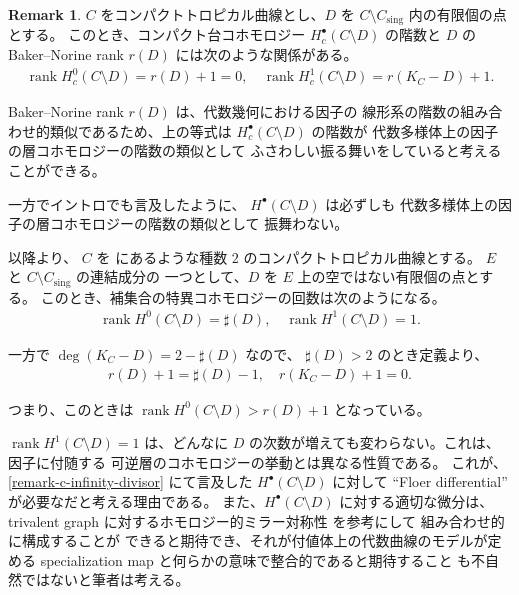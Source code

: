 \documentclass[a4paper,dvipdfmx,reqno,12pt]{amsart}
\theoremstyle{definition}
\newtheorem{remark}[theorem]{Remark}
\newcommand{\opn}[1]{\operatorname{#1}}
\numberwithin{equation}{section}
\begin{document}
\begin{remark}
\label{remark-complement-cohomology}
$C$ をコンパクトトロピカル曲線とし、$D$ を
$C\setminus C_{\mathrm{sing}}$ 内の有限個の点とする。
このとき、コンパクト台コホモロジー
$H_c^{\bullet}(C\setminus D)$ の階数と
$D$ の
Baker--Norine rank $r(D)$ には次のような関係がある。
\begin{align}
\opn{rank} H_c^{0}(C\setminus D)=r(D)+1=0, \quad
\opn{rank} H_c^{1}(C\setminus D)=r(K_C-D)+1.
\end{align}

Baker--Norine rank $r(D)$ は、代数幾何における因子の
線形系の階数の組み合わせ的類似であるため、上の等式は
$H_c^{\bullet}(C\setminus D)$ の階数が
代数多様体上の因子の層コホモロジーの階数の類似として
ふさわしい振る舞いをしていると考えることができる。

一方でイントロでも言及したように、
$H^{\bullet}(C\setminus D)$ は必ずしも
代数多様体上の因子の層コホモロジーの階数の類似として
振舞わない。

以降より、
$C$ を \cite[Figure 1]{MR2457739}
にあるような種数 $2$ のコンパクトトロピカル曲線とする。
$E$ と $C\setminus C_{\mathrm{sing}}$ の連結成分の
一つとして、$D$ を $E$ 上の空ではない有限個の点とする。
このとき、補集合の特異コホモロジーの回数は次のようになる。
\begin{align}
\label{equation-cohomology-behaviour}
\opn{rank} H^{0}(C\setminus D)=\sharp(D), \quad
\opn{rank} H^{1}(C\setminus D)=1.
\end{align}

一方で $\opn{deg}(K_C-D)=2-\sharp (D)$ なので、
$\sharp (D)>2$ のとき定義より、
\begin{align}
\label{equation-rank-behaviour}
r(D)+1=\sharp(D)-1,\quad r(K_C-D)+1=0.
\end{align}

つまり、このときは 
$\opn{rank} H^{0}(C\setminus D)>r(D)+1$ となっている。

$\opn{rank} H^{1}(C\setminus D)=1$ は、どんなに $D$
の次数が増えても変わらない。これは、因子に付随する
可逆層のコホモロジーの挙動とは異なる性質である。
これが、\cref{remark-c-infinity-divisor} にて言及した
$H^{\bullet}(C\setminus D)$ に対して ``Floer differential''
が必要なだと考える理由である。
また、$H^{\bullet}(C\setminus D)$ に対する適切な微分は、
trivalent graph に対するホモロジー的ミラー対称性
\cite{auroux2022lagrangian} を参考にして
組み合わせ的に構成することが
できると期待でき、それが付値体上の代数曲線のモデルが定める
specialization map と何らかの意味で整合的であると期待すること
も不自然ではないと筆者は考える。
\end{remark}
\end{document}
